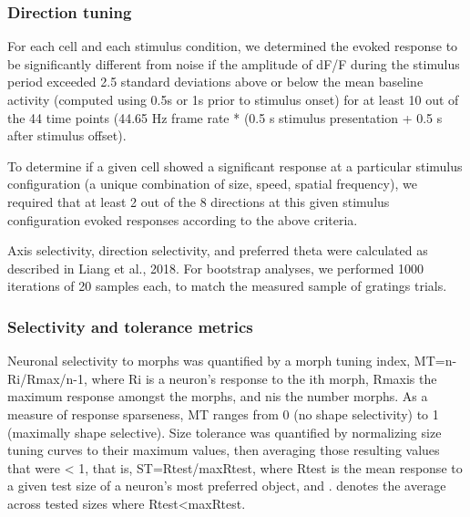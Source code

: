 \subsubsection{Direction tuning}
For each cell and each stimulus condition, we determined the evoked response to be significantly different from noise if the amplitude of dF/F during the stimulus period exceeded 2.5 standard deviations above or below the mean baseline activity (computed using 0.5s or 1s prior to stimulus onset) for at least 10 out of the 44 time points (44.65 Hz frame rate * (0.5 s stimulus presentation + 0.5 s after stimulus offset).

To determine if a given cell showed a significant response at a particular stimulus configuration (a unique combination of size, speed, spatial frequency), we required that at least 2 out of the 8 directions at this given stimulus configuration evoked responses according to the above criteria. 

Axis selectivity, direction selectivity, and preferred theta were calculated as described in Liang et al., 2018\cite{Liang2018a}. For bootstrap analyses, we performed 1000 iterations of 20 samples each, to match the measured sample of gratings trials. 









\subsubsection{Selectivity and tolerance metrics}
Neuronal selectivity to morphs was quantified by a morph tuning index\cite{Zoccolan2007}, MT=n-Ri/Rmax/n-1, where Ri is a neuron’s response to the ith morph, Rmaxis the maximum response amongst the morphs, and nis the number morphs. As a measure of response sparseness, MT ranges from 0 (no shape selectivity) to 1 (maximally shape selective). Size tolerance was quantified by normalizing size tuning curves to their maximum values, then averaging those resulting values that were < 1, that is, ST=Rtest/maxRtest, where Rtest is the mean response to a given test size of a neuron’s most preferred object, and . denotes the average across tested sizes where Rtest<maxRtest. 


